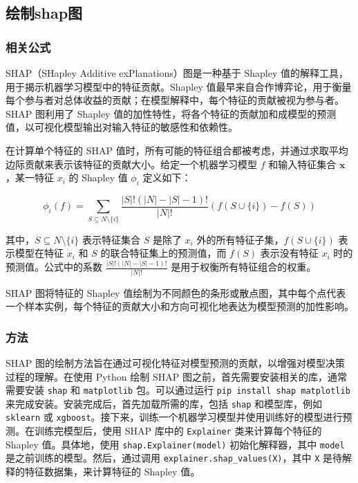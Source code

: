 \documentclass{article}
\begin{document}
\subsection{绘制shap图}



\subsubsection{相关公式}




SHAP（SHapley Additive exPlanations）图是一种基于 Shapley 值的解释工具，用于揭示机器学习模型中的特征贡献。Shapley 值最早来自合作博弈论，用于衡量每个参与者对总体收益的贡献；在模型解释中，每个特征的贡献被视为参与者。SHAP 图利用了 Shapley 值的加性特性，将各个特征的贡献加和成模型的预测值，以可视化模型输出对输入特征的敏感性和依赖性。

在计算单个特征的 SHAP 值时，所有可能的特征组合都被考虑，并通过求取平均边际贡献来表示该特征的贡献大小。给定一个机器学习模型 \( f \) 和输入特征集合 \( \mathbf{x} \)，某一特征 \( x_i \) 的 Shapley 值 \( \phi_i \) 定义如下：

\[
\phi_i(f) = \sum_{S \subseteq N \setminus \{i\}} \frac{|S|! (|N| - |S| - 1)!}{|N|!} \left( f(S \cup \{i\}) - f(S) \right)
\]

其中，\( S \subseteq N \setminus \{i\} \) 表示特征集合 \( S \) 是除了 \( x_i \) 外的所有特征子集，\( f(S \cup \{i\}) \) 表示模型在特征 \( x_i \) 和 \( S \) 的联合特征集上的预测值，而 \( f(S) \) 表示没有特征 \( x_i \) 时的预测值。公式中的系数 \( \frac{|S|! (|N| - |S| - 1)!}{|N|!} \) 是用于权衡所有特征组合的权重。

SHAP 图将特征的 Shapley 值绘制为不同颜色的条形或散点图，其中每个点代表一个样本实例，每个特征的贡献大小和方向可视化地表达为模型预测的加性影响。
\subsubsection{方法}
SHAP 图的绘制方法旨在通过可视化特征对模型预测的贡献，以增强对模型决策过程的理解。在使用 Python 绘制 SHAP 图之前，首先需要安装相关的库，通常需要安装 \texttt{shap} 和 \texttt{matplotlib} 包。可以通过运行 \texttt{pip install shap matplotlib} 来完成安装。安装完成后，首先加载所需的库，包括 \texttt{shap} 和模型库，例如 \texttt{sklearn} 或 \texttt{xgboost}。接下来，训练一个机器学习模型并使用训练好的模型进行预测。在训练完模型后，使用 SHAP 库中的 \texttt{Explainer} 类来计算每个特征的 Shapley 值。具体地，使用 \texttt{shap.Explainer(model)} 初始化解释器，其中 \texttt{model} 是之前训练的模型。然后，通过调用 \texttt{explainer.shap\_values(X)}，其中 \texttt{X} 是待解释的特征数据集，来计算特征的 Shapley 值。
\end{document}

